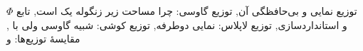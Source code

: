 \documentclass[a4paper,11pt,oneside,openany]{book}
\begin{document}
  {{توزیع نمایی و بی‌حافظگی آن},
   {توزیع گاوسی: چرا مساحت زیر زنگوله یک است},
   {تابع $\Phi$ و استانداردسازی},
   {توزیع لاپلاس: نمایی دوطرفه},
   {توزیع کوشی: شبیه گاوسی ولی با },
   {مقایسهٔ  توزیع‌ها:  و }}

\mainmatter
\setcounter{chapter}{7}   %

\end{document}
